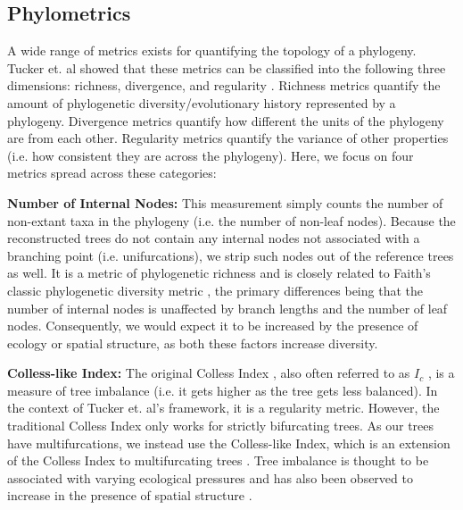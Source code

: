 \subsection{Phylometrics}

A wide range of metrics exists for quantifying the topology of a phylogeny.
Tucker et.
al showed that these metrics can be classified into the following three dimensions: richness, divergence, and regularity \citep{tuckerGuidePhylogeneticMetrics2017}.
Richness metrics quantify the amount of phylogenetic diversity/evolutionary history represented by a phylogeny.
Divergence metrics quantify how different the units of the phylogeny are from each other.
Regularity metrics quantify the variance of other properties (i.e. how consistent they are across the phylogeny).
Here, we focus on four metrics spread across these categories:

\textbf{Number of Internal Nodes:} This measurement simply counts the number of non-extant taxa in the phylogeny (i.e. the number of non-leaf nodes).
Because the reconstructed trees do not contain any internal nodes not associated with a branching point (i.e. unifurcations), we strip such nodes out of the reference trees as well.
It is a metric of phylogenetic richness and is closely related to Faith's classic phylogenetic diversity metric \citep{faithConservationEvaluationPhylogenetic1992}, the primary differences being that the number of internal nodes is unaffected by branch lengths and the number of leaf nodes.
Consequently, we would expect it to be increased by the presence of ecology or spatial structure, as both these factors increase diversity.

\textbf{Colless-like Index:}
The original Colless Index \citep{collessReviewPhylogeneticsTheory1982}, also often referred to as $I_c$ \citep{shaoTreeBalance1990}, is a measure of tree imbalance (i.e. it gets higher as the tree gets less balanced).
In the context of Tucker et.
al's framework, it is a regularity metric.
However, the traditional Colless Index only works for strictly bifurcating trees.
As our trees have multifurcations, we instead use the Colless-like Index, which is an extension of the Colless Index to multifurcating trees \citep{mirSoundCollesslikeBalance2018}.
Tree imbalance is thought to be associated with varying ecological pressures \citep{chamberlainPhylogeneticTreeShape2014, burressEcologicalOpportunityAlters} and has also been observed to increase in the presence of spatial structure \citep{scottInferringTumorProliferative2020}.

